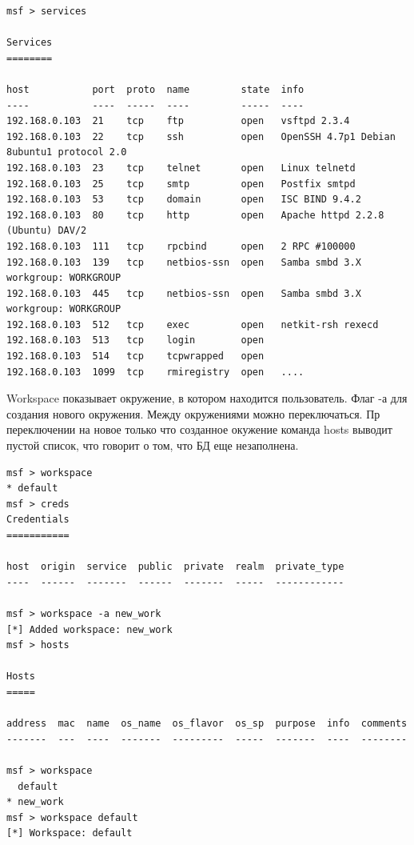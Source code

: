 \documentclass[10pt,a4paper]{report}
\begin{document}
\begin{verbatim}
msf > services

Services
========

host           port  proto  name         state  info
----           ----  -----  ----         -----  ----
192.168.0.103  21    tcp    ftp          open   vsftpd 2.3.4
192.168.0.103  22    tcp    ssh          open   OpenSSH 4.7p1 Debian 8ubuntu1 protocol 2.0
192.168.0.103  23    tcp    telnet       open   Linux telnetd
192.168.0.103  25    tcp    smtp         open   Postfix smtpd
192.168.0.103  53    tcp    domain       open   ISC BIND 9.4.2
192.168.0.103  80    tcp    http         open   Apache httpd 2.2.8 (Ubuntu) DAV/2
192.168.0.103  111   tcp    rpcbind      open   2 RPC #100000
192.168.0.103  139   tcp    netbios-ssn  open   Samba smbd 3.X workgroup: WORKGROUP
192.168.0.103  445   tcp    netbios-ssn  open   Samba smbd 3.X workgroup: WORKGROUP
192.168.0.103  512   tcp    exec         open   netkit-rsh rexecd
192.168.0.103  513   tcp    login        open   
192.168.0.103  514   tcp    tcpwrapped   open   
192.168.0.103  1099  tcp    rmiregistry  open   ....
\end{verbatim}
Workspace показывает окружение, в котором находится пользователь. Флаг -а для создания нового окружения. Между окружениями можно переключаться. Пр переключении на новое  только что созданное окужение команда hosts выводит пустой список, что говорит о том, что БД еще незаполнена.
\begin{verbatim}
msf > workspace
* default
msf > creds
Credentials
===========

host  origin  service  public  private  realm  private_type
----  ------  -------  ------  -------  -----  ------------

msf > workspace -a new_work
[*] Added workspace: new_work
msf > hosts

Hosts
=====

address  mac  name  os_name  os_flavor  os_sp  purpose  info  comments
-------  ---  ----  -------  ---------  -----  -------  ----  --------

msf > workspace 
  default
* new_work
msf > workspace default
[*] Workspace: default
\end{verbatim}
\end{document}
